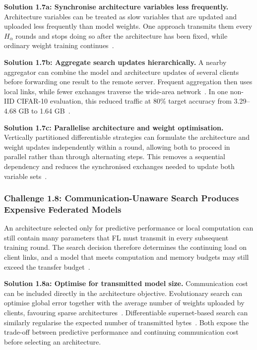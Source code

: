 \noindent\textbf{Solution 1.7a: Synchronise architecture variables less frequently.} Architecture variables can be treated as slow variables that are updated and uploaded less frequently than model weights. One approach transmits them every \(H_{\alpha}\) rounds and stops doing so after the architecture has been fixed, while ordinary weight training continues~\cite{fedregnas_2025}.

\noindent\textbf{Solution 1.7b: Aggregate search updates hierarchically.} A nearby aggregator can combine the model and architecture updates of several clients before forwarding one result to the remote server. Frequent aggregation then uses local links, while fewer exchanges traverse the wide-area network~\cite{finch_2024}. In one non-IID CIFAR-10 evaluation, this reduced traffic at 80\% target accuracy from 3.29--4.68 GB to 1.64 GB~\cite{finch_2024}.

\noindent\textbf{Solution 1.7c: Parallelise architecture and weight optimisation.} Vertically partitioned differentiable strategies can formulate the architecture and weight updates independently within a round, allowing both to proceed in parallel rather than through alternating steps. This removes a sequential dependency and reduces the synchronised exchanges needed to update both variable sets~\cite{self-supervised_vertical_fednas_2023}.

\subsubsection{Challenge 1.8: Communication-Unaware Search Produces Expensive Federated Models}

An architecture selected only for predictive performance or local computation can still contain many parameters that FL must transmit in every subsequent training round. The search decision therefore determines the continuing load on client links, and a model that meets computation and memory budgets may still exceed the transfer budget~\cite{multi_objective_evo_fl_2020}.

\noindent\textbf{Solution 1.8a: Optimise for transmitted model size.} Communication cost can be included directly in the architecture objective. Evolutionary search can optimise global error together with the average number of weights uploaded by clients, favouring sparse architectures~\cite{multi_objective_evo_fl_2020}. Differentiable supernet-based search can similarly regularise the expected number of transmitted bytes~\cite{fedregnas_2025}. Both expose the trade-off between predictive performance and continuing communication cost before selecting an architecture.

